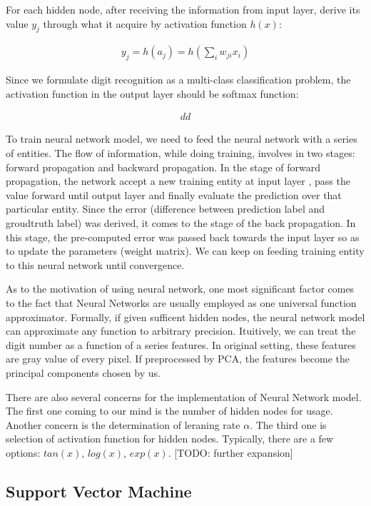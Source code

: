 \documentclass{article} %
\begin{document}
For each hidden node, after receiving the information from input layer,
derive its value $y_j$ through what it acquire by activation function $h(x)$:

\begin{align}
   y_j = h(a_j) = h(\sum_{i} w_{ji} x_i)    
\end{align}

Since we formulate digit recognition as a multi-class classification problem,
the activation function in the output layer should be softmax function: 

\begin{align}
    dd
\end{align}


To train neural network model, we need to feed the neural network with a
series of entities. The flow of information, while doing training,
involves in two stages: forward propagation and backward propagation.  In the
stage of forward propagation, the network accept a new training entity at input layer
, pass the value forward until output layer and finally evaluate the
prediction over that particular entity. Since the error (difference
between prediction label and groudtruth label) was derived, it comes to the
stage of the back propagation. In this stage, the pre-computed error was
passed back towards the input layer so as to update the parameters (weight
matrix). We can keep on feeding training entity to this neural network until
convergence.

As to the motivation of using neural network, one most significant factor
comes to the fact that Neural Networks are usually employed as one universal
function approximator. Formally, if given sufficent hidden nodes, the neural
network model can approximate any function to arbitrary precision. Ituitively,
we can treat the digit number as a function of a series features. In original
setting, these features are gray value of every pixel. If preprocessed by PCA,
the features become the principal components chosen by us. 

There are also several concerns for the implementation of Neural Network model.
The first one coming to our mind is the number of hidden nodes for usage.
Another concern is the determination of leraning rate $\alpha$. The third one
is selection of activation function for hidden nodes. Typically, there are a
few options: $tan(x)$, $log(x)$, $exp(x)$.
{\large [TODO: further expansion]}


\subsection{Support Vector Machine}
\end{document}
